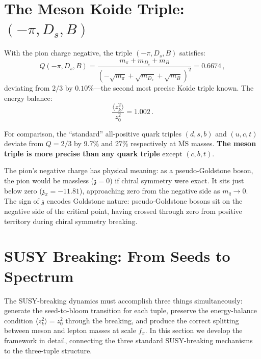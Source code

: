\documentclass[12pt,a4paper]{article}
\newcommand{\zch}{\mathfrak{z}}
\begin{document}
\section{The Meson Koide Triple: $(-\pi, D_s, B)$}
\label{sec:mesonkoide}

With the pion charge negative, the triple $(-\pi, D_s, B)$ satisfies:
\begin{equation}
Q(-\pi, D_s, B) = 
\frac{m_\pi + m_{D_s} + m_B}{(-\sqrt{m_\pi} + \sqrt{m_{D_s}} + \sqrt{m_B})^2}
= 0.6674\,,
\end{equation}
deviating from $2/3$ by $0.10\%$---the second most precise Koide 
triple known. The energy balance:
\begin{equation}
\frac{\langle z_k^2\rangle}{z_0^2} = 1.002\,.
\end{equation}

For comparison, the ``standard'' all-positive quark triples $(d,s,b)$ 
and $(u,c,t)$ deviate from $Q = 2/3$ by 9.7\% and 27\% respectively 
at $\overline{\text{MS}}$ masses. \textbf{The meson triple is more 
precise than any quark triple} except $(c,b,t)$.

The pion's negative charge has physical meaning: as a pseudo-Goldstone 
boson, the pion would be massless ($\zch = 0$) if chiral symmetry were 
exact. It sits just below zero ($\zch_\pi = -11.81$), approaching zero 
from the negative side as $m_q \to 0$. The sign of $\zch$ encodes 
Goldstone nature: pseudo-Goldstone bosons sit on the negative side 
of the critical point, having crossed through zero from positive 
territory during chiral symmetry breaking.

\section{SUSY Breaking: From Seeds to Spectrum}
\label{sec:breaking}

The SUSY-breaking dynamics must accomplish three things simultaneously:
generate the seed-to-bloom transition for each tuple, preserve the 
energy-balance condition $\langle z_k^2\rangle = z_0^2$ through the 
breaking, and produce the correct splitting between meson and lepton 
masses at scale $f_\pi$. In this section we develop the framework in 
detail, connecting the three standard SUSY-breaking mechanisms to the 
three-tuple structure.
\end{document}
